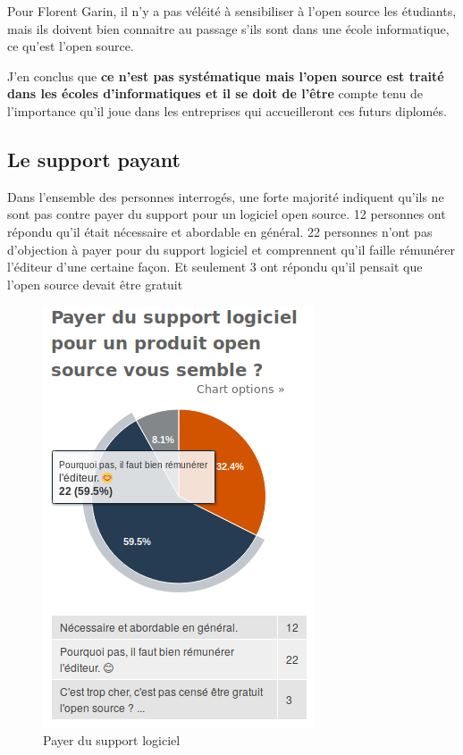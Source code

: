 			Pour Florent Garin, il n'y a pas véléité à sensibiliser à l'open source les étudiants, mais ils doivent bien connaitre au passage s'ils sont dans une école informatique, ce qu'est l'open source.

			J'en conclus que \textbf{ce n'est pas systématique mais l'open source est traité dans les écoles d'informatiques et il se doit de l'être} compte tenu de l'importance qu'il joue dans les entreprises qui accueilleront ces futurs diplomés.

		\subsection{Le support payant}

			Dans l'ensemble des personnes interrogés, une forte majorité indiquent qu'ils ne sont pas contre payer du support pour un logiciel open source. 12 personnes ont répondu qu'il était nécessaire et abordable en général. 22 personnes n'ont pas d'objection à payer pour du support logiciel et comprennent qu'il faille rémunérer l'éditeur d'une certaine façon. Et seulement 3 ont répondu qu'il pensait que l'open source devait être gratuit

			\begin{figure}[!htb]
				\center
				\includegraphics[scale=0.58]{./img/a11}
				\caption{Payer du support logiciel}					
			\end{figure}

